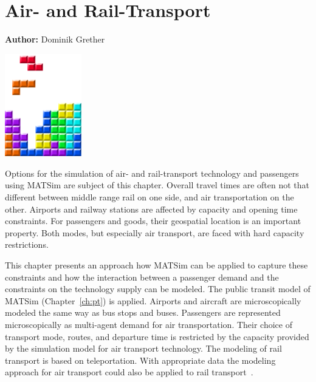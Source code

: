 \chapter{Air- and Rail-Transport}
\label{ch:air}

\hfill \textbf{Author:} Dominik Grether

\begin{center} \includegraphics[width=0.25\textwidth, angle=0]{figures/MATSimBook.png} \end{center}


Options for the simulation of air- and rail-transport technology and passengers using MATSim are subject of this chapter. 
Overall travel times are often not that different between middle range rail on one side, and air transportation on the other.
Airports and railway stations are affected by capacity and opening time constraints. 
For passengers and goods, their geospatial location is an important property. 
Both modes, but especially air transport, are faced with hard capacity restrictions. 

This chapter presents an approach how MATSim can be applied to capture these constraints and how the interaction between a passenger demand and the constraints on the technology supply can be modeled. 
The public transit model of MATSim (Chapter~\ref{ch:pt}) is applied. %
Airports and aircraft are microscopically modeled the same way as bus stops and buses. 
Passengers are represented microscopically as multi-agent demand for air transportation. 
Their choice of transport mode, routes, and departure time is restricted by the capacity provided by the simulation model for air transport technology. 
The modeling of rail transport is based on teleportation. 
With appropriate data the modeling approach for air transport could also be applied to rail transport~\citep{Quick2012BARailTraffic}.  


